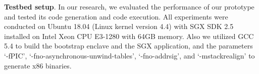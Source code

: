 




\noindent\textbf{Testbed setup}. 
In our research, we evaluated the performance of our prototype and tested its code generation and code execution. All experiments were conducted on Ubuntu 18.04 (Linux kernel version 4.4) with SGX SDK 2.5 installed on Intel Xeon CPU E3-1280 with 64GB memory.
Also we utilized  GCC 5.4 to build the bootstrap enclave and the SGX application, and the parameters `-fPIC', `-fno-asynchronous-unwind-tables', `-fno-addrsig', and `-mstackrealign' to generate x86 binaries. 

